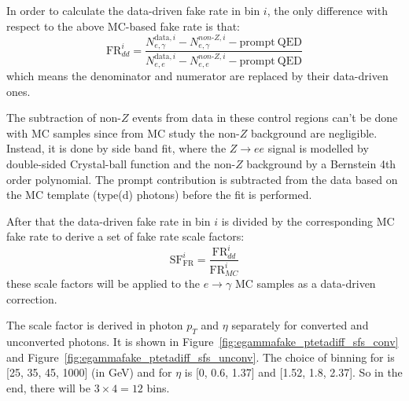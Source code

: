 In order to calculate the data-driven fake rate in bin $i$, the only difference with respect to the above MC-based fake rate is that:
\begin{equation}
\text{FR}_{dd}^i = \frac{N_{e,\gamma}^{\mathrm{data},i} - N_{e,\gamma}^{non\text{-}Z,i} - \mathrm{prompt\ QED}}{N_{e,e}^{\mathrm{data},i} - N_{e,e}^{non\text{-}Z,i} - \mathrm{prompt\ QED}}
\end{equation}
which means the denominator and numerator are replaced by their data-driven ones. 

The subtraction of non-$Z$ events from data in these control regions can't be done with MC samples since from MC study the non-$Z$ background are negligible.
Instead, it is done by side band fit,
where the $Z\to ee$ signal is modelled by double-sided Crystal-ball function and the non-$Z$ background by a Bernstein 4th order polynomial. The prompt contribution is subtracted from the data based on the MC template (type(d) photons) before the fit is performed.

After that the data-driven fake rate in bin $i$ is divided by the corresponding MC fake rate to derive a set of fake rate scale factors:
\begin{equation}
\text{SF}_{\text{FR}}^i = \frac{\text{FR}_{dd}^i}{\text{FR}_{MC}^i}
\end{equation}
these scale factors will be applied to the $e\to\gamma$ MC samples as a data-driven correction.

The scale factor is derived in photon $p_T$ and $\eta$ separately for converted and unconverted photons. It is shown in Figure~\ref{fig:egammafake_ptetadiff_sfs_conv} and Figure~\ref{fig:egammafake_ptetadiff_sfs_unconv}. The choice of binning for \pt is [25, 35, 45, 1000] (in GeV) and for $\eta$ is [0, 0.6, 1.37] and [1.52, 1.8, 2.37]. So in the end, there will be $3\times4 = 12$ bins.


\vspace*{0.5cm}

